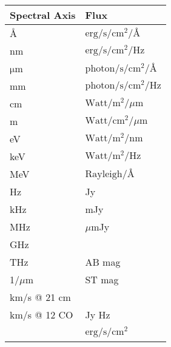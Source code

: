 \centering
\begin{tabular}{ll}
    \toprule
    Spectral Axis                & Flux \\
    \midrule
    \mbox{\AA}              & $\mathrm{erg}/\mathrm{s}/\mathrm{cm}^{2}/\mbox{\AA}$     \\
    nm                      & $\mathrm{erg}/\mathrm{s}/\mathrm{cm}^{2}/\mathrm{Hz}$    \\
    $\mathrm{\mu}$m         & $\mathrm{photon}/\mathrm{s}/\mathrm{cm}^{2}/\mbox{\AA}$  \\
    mm                      & $\mathrm{photon}/\mathrm{s}/\mathrm{cm}^{2}/\mathrm{Hz}$ \\
    cm                      & $\mathrm{Watt}/\mathrm{m}^{2}/{\mu}\mathrm{m}$           \\
    m                       & $\mathrm{Watt}/\mathrm{cm}^{2}/\mu\mathrm{m}$            \\
    eV                      & $\mathrm{Watt}/\mathrm{m}^{2}/\mathrm{nm}$               \\
    keV                     & $\mathrm{Watt}/\mathrm{m}^{2}/\mathrm{Hz}$               \\
    MeV                     & $\mathrm{Rayleigh}/\mbox{\AA}$                           \\
    Hz                      & Jy                									   \\
    kHz                     & mJy               									   \\
    MHz                     & ${\mu}$mJy             								   \\
    GHz                     & ~                 									   \\
    THz                     & AB mag           										   \\
    1/${\mu}$m              & ST mag             									   \\
    km/s @ 21 cm            & ~               										   \\
    km/s @ 12 CO            & Jy Hz             									   \\
    ~ 					    & $\mathrm{erg}/\mathrm{s}/\mathrm{cm}^{2}$                \\
    \bottomrule
\end{tabular}